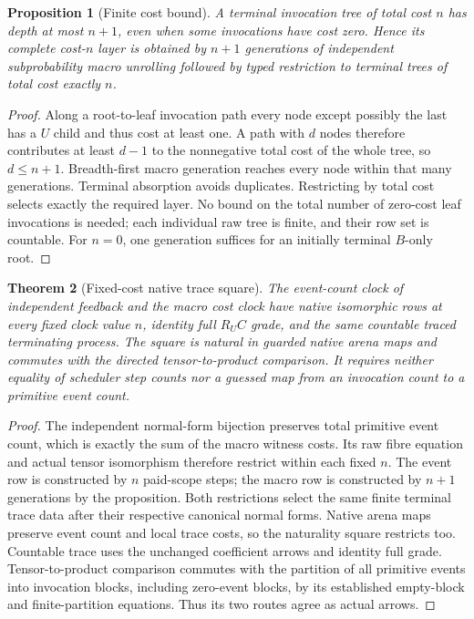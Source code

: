 \documentclass[11pt]{article}
\newtheorem{theorem}{Theorem}\newtheorem{proposition}[theorem]{Proposition}
\begin{document}
\begin{proposition}[Finite cost bound]
A terminal invocation tree of total cost $n$ has depth at most $n+1$, even when some invocations have cost zero. Hence its complete cost-$n$ layer is obtained by $n+1$ generations of independent subprobability macro unrolling followed by typed restriction to terminal trees of total cost exactly $n$.
\end{proposition}
\begin{proof}
Along a root-to-leaf invocation path every node except possibly the last has a $U$ child and thus cost at least one. A path with $d$ nodes therefore contributes at least $d-1$ to the nonnegative total cost of the whole tree, so $d\leq n+1$. Breadth-first macro generation reaches every node within that many generations. Terminal absorption avoids duplicates. Restricting by total cost selects exactly the required layer. No bound on the total number of zero-cost leaf invocations is needed; each individual raw tree is finite, and their row set is countable. For $n=0$, one generation suffices for an initially terminal $B$-only root.
\end{proof}

\begin{theorem}[Fixed-cost native trace square]
The event-count clock of independent feedback and the macro cost clock have native isomorphic rows at every fixed clock value $n$, identity full $R_UC$ grade, and the same countable traced terminating process. The square is natural in guarded native arena maps and commutes with the directed tensor-to-product comparison. It requires neither equality of scheduler step counts nor a guessed map from an invocation count to a primitive event count.
\end{theorem}
\begin{proof}
The independent normal-form bijection preserves total primitive event count, which is exactly the sum of the macro witness costs. Its raw fibre equation and actual tensor isomorphism therefore restrict within each fixed $n$. The event row is constructed by $n$ paid-scope steps; the macro row is constructed by $n+1$ generations by the proposition. Both restrictions select the same finite terminal trace data after their respective canonical normal forms. Native arena maps preserve event count and local trace costs, so the naturality square restricts too. Countable trace uses the unchanged coefficient arrows and identity full grade. Tensor-to-product comparison commutes with the partition of all primitive events into invocation blocks, including zero-event blocks, by its established empty-block and finite-partition equations. Thus its two routes agree as actual arrows.
\end{proof}
\end{document}

